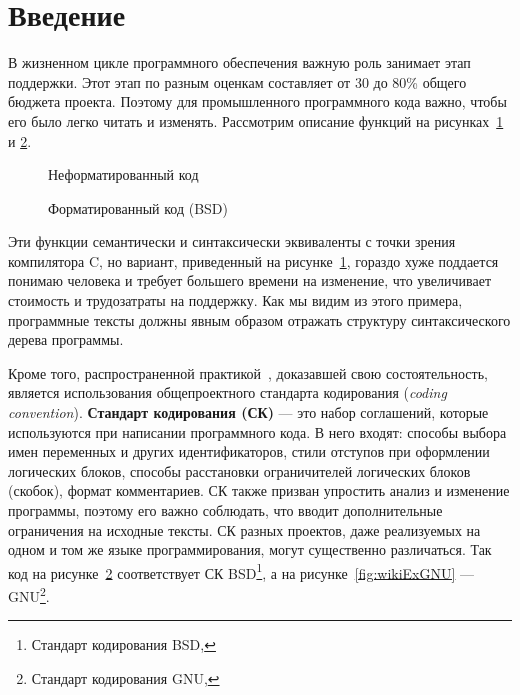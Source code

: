\section*{Введение}

В жизненном цикле программного обеспечения важную роль занимает этап
поддержки\cite{maintance}. Этот этап по разным оценкам
составляет от 30 до 80\% общего бюджета проекта. Поэтому для
промышленного программного кода важно, чтобы его было легко читать и изменять.
Рассмотрим описание функций
на рисунках~\ref{fig:wikiExUnfor} и \ref{fig:wikiExBSD}.

\begin{figure}[h!]
	\centering
	
	\caption{Неформатированный код}
	\label{fig:wikiExUnfor}
\end{figure}

\begin{figure}[h!]
	\centering
	
  \caption{Форматированный код (BSD)}
	\label{fig:wikiExBSD}
\end{figure}

Эти функции семантически и синтаксически эквиваленты с точки зрения
компилятора C, но вариант, приведенный на
рисунке~\ref{fig:wikiExUnfor}, гораздо хуже
поддается понимаю человека и требует большего времени на изменение,
что увеличивает стоимость и трудозатраты на поддержку. Как мы видим из этого
примера, программные тексты должны явным образом отражать
структуру синтаксического дерева программы.

Кроме того, распространенной практикой~\cite{codingStandarts},
доказавшей свою состоятельность, является использования
общепроектного стандарта кодирования (\textit{coding convention}).
\textbf{Стандарт кодирования (СК)} ---
это набор соглашений, которые используются
при написании программного кода. В него входят: способы выбора имен переменных
и других идентификаторов, стили отступов при оформлении логических блоков,
способы расстановки ограничителей логических блоков (скобок),
формат комментариев. СК также призван упростить анализ и изменение
программы, поэтому его важно соблюдать, что вводит
дополнительные ограничения на исходные тексты. СК разных проектов, даже
реализуемых на одном и том же языке программирования, могут существенно
различаться.
Так код на рисунке~\ref{fig:wikiExBSD} соответствует СК BSD\footnote{
Стандарт кодирования BSD, },
а на рисунке~\ref{fig:wikiExGNU} --- GNU\footnote{
Стандарт кодирования GNU, }.

